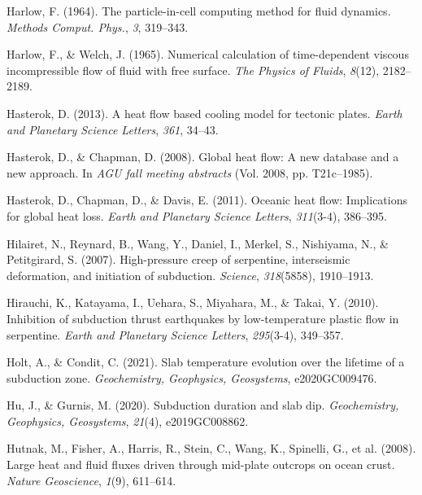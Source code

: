 \begin{CSLReferences}{1}{1}
\leavevmode{}%
Harlow, F. (1964). The particle-in-cell computing method for fluid dynamics. \emph{Methods Comput. Phys.}, \emph{3}, 319--343.

\leavevmode{}%
Harlow, F., \& Welch, J. (1965). Numerical calculation of time-dependent viscous incompressible flow of fluid with free surface. \emph{The Physics of Fluids}, \emph{8}(12), 2182--2189.

\leavevmode{}%
Hasterok, D. (2013). A heat flow based cooling model for tectonic plates. \emph{Earth and Planetary Science Letters}, \emph{361}, 34--43.

\leavevmode{}%
Hasterok, D., \& Chapman, D. (2008). Global heat flow: A new database and a new approach. In \emph{AGU fall meeting abstracts} (Vol. 2008, pp. T21c--1985).

\leavevmode{}%
Hasterok, D., Chapman, D., \& Davis, E. (2011). Oceanic heat flow: Implications for global heat loss. \emph{Earth and Planetary Science Letters}, \emph{311}(3-4), 386--395.

\leavevmode{}%
Hilairet, N., Reynard, B., Wang, Y., Daniel, I., Merkel, S., Nishiyama, N., \& Petitgirard, S. (2007). High-pressure creep of serpentine, interseismic deformation, and initiation of subduction. \emph{Science}, \emph{318}(5858), 1910--1913.

\leavevmode{}%
Hirauchi, K., Katayama, I., Uehara, S., Miyahara, M., \& Takai, Y. (2010). Inhibition of subduction thrust earthquakes by low-temperature plastic flow in serpentine. \emph{Earth and Planetary Science Letters}, \emph{295}(3-4), 349--357.

\leavevmode{}%
Holt, A., \& Condit, C. (2021). Slab temperature evolution over the lifetime of a subduction zone. \emph{Geochemistry, Geophysics, Geosystems}, e2020GC009476.

\leavevmode{}%
Hu, J., \& Gurnis, M. (2020). Subduction duration and slab dip. \emph{Geochemistry, Geophysics, Geosystems}, \emph{21}(4), e2019GC008862.

\leavevmode{}%
Hutnak, M., Fisher, A., Harris, R., Stein, C., Wang, K., Spinelli, G., et al. (2008). Large heat and fluid fluxes driven through mid-plate outcrops on ocean crust. \emph{Nature Geoscience}, \emph{1}(9), 611--614.


\end{CSLReferences}
